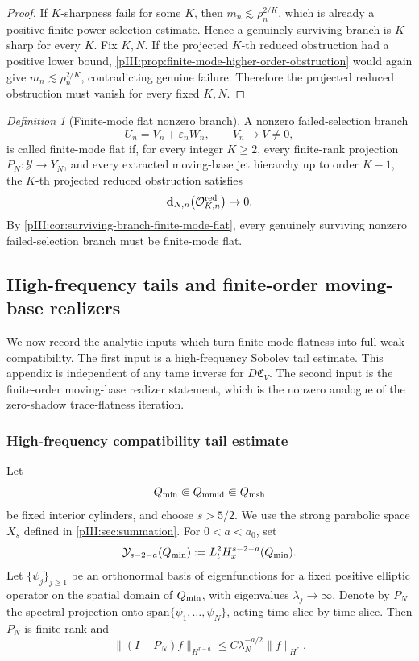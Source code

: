 \documentclass[11pt]{article}
\numberwithin{equation}{section}
\theoremstyle{plain}
\theoremstyle{definition}
\theoremstyle{remark}
\newtheorem{definition}{Definition}[section]
\newcommand{\calC}{\mathfrak C}
\newcommand{\calY}{\mathcal Y}
\begin{document}
\begin{proof}
If \(K\)-sharpness fails for some \(K\), then \(m_n\lesssim\rho_n^{2/K}\), which is already a positive
finite-power selection estimate.  Hence a genuinely surviving branch is \(K\)-sharp for every
\(K\).  Fix \(K,N\).  If the projected \(K\)-th reduced obstruction had a positive lower bound,
\cref{pIII:prop:finite-mode-higher-order-obstruction} would again give
\(m_n\lesssim\rho_n^{2/K}\), contradicting genuine failure.  Therefore the projected reduced
obstruction must vanish for every fixed \(K,N\).
\end{proof}

\begin{definition}[Finite-mode flat nonzero branch]
\label{pIII:def:finite-mode-flat-nonzero-branch}
A nonzero failed-selection branch
\[
        U_n=V_n+\varepsilon_nW_n,
        \qquad
        V_n\to V\neq0,
\]
is called finite-mode flat if, for every integer \(K\ge2\), every finite-rank projection
\(P_N:\calY\to Y_N\), and every extracted moving-base jet hierarchy up to order \(K-1\), the
\(K\)-th projected reduced obstruction satisfies
\[
        \mathbf d_{N,n}\bigl(\mathcal O^{\rm red}_{K,n}\bigr)\to0.
\]
By \cref{pIII:cor:surviving-branch-finite-mode-flat}, every genuinely surviving nonzero
failed-selection branch must be finite-mode flat.
\end{definition}

\subsection{High-frequency tails and finite-order moving-base realizers}
\label{pIII:sec:non-tame-tail-and-realizers}

We now record the analytic inputs which turn finite-mode flatness into full weak compatibility.  The
first input is a high-frequency Sobolev tail estimate.  This appendix is independent of any tame inverse
for \(D\calC_V\).  The second input is the finite-order moving-base realizer statement, which is the
nonzero analogue of the zero-shadow trace-flatness iteration.

\subsubsection{High-frequency compatibility tail estimate}
\label{pIII:subsec:high-frequency-compatibility-tail}

Let
\[
        Q_{\rm min}\Subset Q_{\rm mmid}\Subset Q_{\rm msh}
\]
be fixed interior cylinders, and choose \(s>5/2\).  We use the strong parabolic space \(X_s\) defined
in \cref{pIII:sec:summation}.  For \(0<a<a_0\), set
\[
        \calY_{s-2-a}(Q_{\rm min})
        :=L^2_tH^{s-2-a}_x(Q_{\rm min}).
\]
Let \(\{\psi_j\}_{j\ge1}\) be an orthonormal basis of eigenfunctions for a fixed positive elliptic
operator on the spatial domain of \(Q_{\rm min}\), with eigenvalues \(\lambda_j\to\infty\).  Denote by
\(P_N\) the spectral projection onto \(\mathrm{span}\{\psi_1,\ldots,\psi_N\}\), acting time-slice by
time-slice.  Then \(P_N\) is finite-rank and
\[
        \|(I-P_N)f\|_{H^{r-a}}
        \le
        C\lambda_N^{-a/2}\|f\|_{H^r}.
\]
\end{document}
